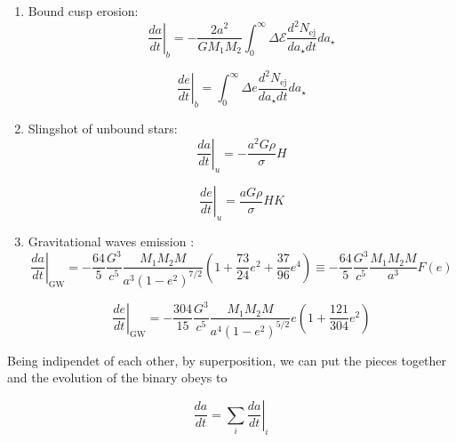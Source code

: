 \documentclass[12pt,twoside,openany]{book}
\begin{document}
\begin{enumerate}
    \item Bound cusp erosion:
    \begin{equation}\label{Sesana_2010 da/dt BOUND}
    \left.\frac{da}{dt}\right|_{b} = -\frac{2a^2}{G M_1 M_2} \int_0^\infty \Delta \mathcal{E}\frac{d^2 N_{\mathrm{ej}}}{da_\star dt} da_\star
\end{equation}

\begin{equation}\label{Sesana_2010 de/dt BOUND}
    \left.\frac{de}{dt}\right|_{b}= \int_0^\infty \Delta e \frac{d^2 N_{\mathrm{ej}}}{da_\star dt} da_\star
\end{equation}
    
\item   Slingshot of unbound stars:
\begin{equation}
    \left.\frac{da}{dt}\right|_{u} = -\frac{a^2 G \rho}{\sigma} H
\end{equation}

\begin{equation}
    \left.\frac{de}{dt}\right|_{u} = \frac{a G \rho}{\sigma} H K
\end{equation}

\item Gravitational waves emission \cite{Peters_1963}:
\begin{equation}
    \left.\frac{da}{dt}\right|_{\mathrm{GW}} = -\frac{64}{5} \frac{G^3}{c^5} \frac{M_1 M_2 M}{a^3 (1 - e^2)^{7/2}} \left( 1 + \frac{73}{24} e^2 + \frac{37}{96} e^4 \right)\equiv -\frac{64}{5} \frac{G^3}{c^5} \frac{M_1 M_2 M}{a^3}F(e)
\end{equation}


\begin{equation}
    \left.\frac{de}{dt}\right|_{\mathrm{GW}} = -\frac{304}{15} \frac{G^3}{c^5} \frac{M_1 M_2 M}{a^4 (1 - e^2)^{5/2}} e \left( 1 + \frac{121}{304} e^2 \right)
\end{equation}

\end{enumerate}
Being indipendet of each other, by superposition, we can put
the pieces together and the evolution of the binary obeys to


\begin{equation}\label{Sesana_2010 da/dt TOT}
    \frac{da}{dt} = \sum_i \left.\frac{da}{dt}\right|_i
\end{equation}
\end{document}

